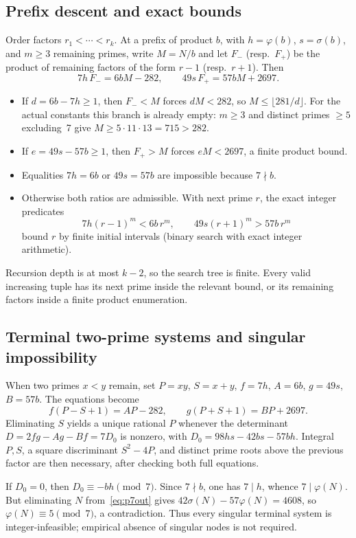 \documentclass[11pt,reqno]{amsart}
\newcommand{\ph}{\varphi}
\newcommand{\sig}{\sigma}
\theoremstyle{definition}
\begin{document}
\subsection{Prefix descent and exact bounds}
Order factors \(r_1<\cdots<r_k\). At a prefix of product \(b\), with \(h=\ph(b)\), \(s=\sig(b)\), and \(m\ge 3\) remaining primes, write \(M=N/b\) and let \(F_-\) (resp.\ \(F_+\)) be the product of remaining factors of the form \(r-1\) (resp.\ \(r+1\)). Then
\[
7h\,F_-=6bM-282,\qquad 49s\,F_+=57bM+2697.
\]
\begin{itemize}
\item If \(d=6b-7h\ge 1\), then \(F_-<M\) forces \(dM<282\), so \(M\le\lfloor 281/d\rfloor\). For the actual constants this branch is already empty: \(m\ge 3\) and distinct primes \(\ge 5\) excluding~7 give \(M\ge 5\cdot 11\cdot 13=715>282\).
\item If \(e=49s-57b\ge 1\), then \(F_+>M\) forces \(eM<2697\), a finite product bound.
\item Equalities \(7h=6b\) or \(49s=57b\) are impossible because \(7\nmid b\).
\item Otherwise both ratios are admissible. With next prime \(r\), the exact integer predicates
\[
7h(r-1)^m<6b\,r^m,\qquad 49s(r+1)^m>57b\,r^m
\]
bound \(r\) by finite initial intervals (binary search with exact integer arithmetic).
\end{itemize}
Recursion depth is at most \(k-2\), so the search tree is finite. Every valid increasing tuple has its next prime inside the relevant bound, or its remaining factors inside a finite product enumeration.

\subsection{Terminal two-prime systems and singular impossibility}
When two primes \(x<y\) remain, set \(P=xy\), \(S=x+y\), \(f=7h\), \(A=6b\), \(g=49s\), \(B=57b\). The equations become
\[
f(P-S+1)=AP-282,\qquad g(P+S+1)=BP+2697.
\]
Eliminating \(S\) yields a unique rational \(P\) whenever the determinant \(D=2fg-Ag-Bf=7D_0\) is nonzero, with \(D_0=98hs-42bs-57bh\). Integral \(P,S\), a square discriminant \(S^2-4P\), and distinct prime roots above the previous factor are then necessary, after checking both full equations.

If \(D_0=0\), then \(D_0\equiv -bh\pmod 7\). Since \(7\nmid b\), one has \(7\mid h\), whence \(7\mid\ph(N)\). But eliminating \(N\) from~\eqref{eq:p7out} gives \(42\sig(N)-57\ph(N)=4608\), so \(\ph(N)\equiv 5\pmod 7\), a contradiction. Thus every singular terminal system is integer-infeasible; empirical absence of singular nodes is not required.
\end{document}
